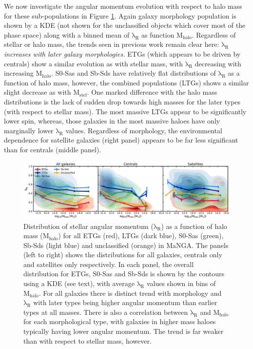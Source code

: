 We now investigate the angular momentum evolution with respect to halo mass for these sub-populations in Figure \ref{fig:morph_lambdaR_mhalo}. Again galaxy morphology population is shown by a KDE (not shown for the unclassified objects which cover most of the phase space) along with a binned mean of $\mathrm{\lambda_R}$ as function $\mathrm{M_{halo}}$. Regardless of stellar or halo mass, the trends seen in previous work remain clear here: \textit{$\mathrm{\lambda_R}$ increases with later galaxy morphologies.} ETGs (which appears to be driven by centrals) show a similar evolution as with stellar mass, with $\mathrm{\lambda_R}$ decreasing with increasing $\mathrm{M_{halo}}$. S0-Sas and Sb-Sds have relatively flat distributions of $\mathrm{\lambda_R}$ as a function of halo mass, however, the combined populations (LTGs) shows a similar slight decrease as with $\mathrm{M_{stel}}$. One marked difference with the halo mass distributions is the lack of sudden drop towards high masses for the later types (with respect to stellar mass). The most massive LTGs appear to be significantly lower spin, whereas, those galaxies in the most massive haloes have only marginally lower $\mathrm{\lambda_R}$ values. Regardless of morphology, the environmental dependence for satellite galaxies (right panel) appears to be far less significant than for centrals (middle panel). 

\begin{figure}
    \centering\includegraphics[width=\linewidth]{thesis/latex/cw_spin/morphology_lambdaR_mhalo_kde_wo_unclassified.pdf}
    \caption{Distribution of stellar angular momentum ($\mathrm{\lambda_R}$) as a function of halo mass ($\mathrm{M_{halo}}$) for all ETGs (red), LTGs (dark blue), S0-Sas (green), Sb-Sds (light blue) and unclassified (orange) in MaNGA. The panels (left to right) shows the distributions for all galaxies, centrals only and satellites only respectively. In each panel, the overall distribution for ETGs, S0-Sas and Sb-Sds is shown by the contours using a KDE (see text), with average $\mathrm{\lambda_R}$ values shown in bins of $\mathrm{M_{halo}}$. For all galaxies there is distinct trend with morphology and $\mathrm{\lambda_R}$  with later types being higher angular momentum than earlier types at all masses. There is also a correlation between $\mathrm{\lambda_R}$ and $\mathrm{M_{halo}}$ for each morphological type, with galaxies in higher mass haloes typically having lower angular momentum. The trend is far weaker than with respect to stellar mass, however.}
\label{fig:morph_lambdaR_mhalo}
\end{figure} 


